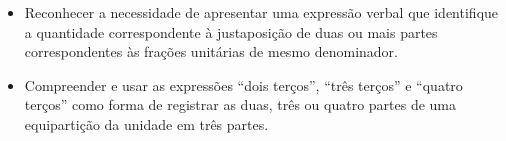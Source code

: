 \begin{multicols}{2}
  \begin{objetivos}{}{}
  \begin{itemize} %
    \item Reconhecer a necessidade de apresentar uma expressão verbal que identifique a quantidade correspondente à justaposição de duas ou mais partes correspondentes às frações unitárias de mesmo denominador.
\item Compreender e usar as expressões ``dois terços'', ``três terços'' e ``quatro terços'' como forma de registrar as duas, três ou quatro partes de uma equipartição da unidade em três partes.
  \end{itemize} %
\end{objetivos}


\end{multicols}
